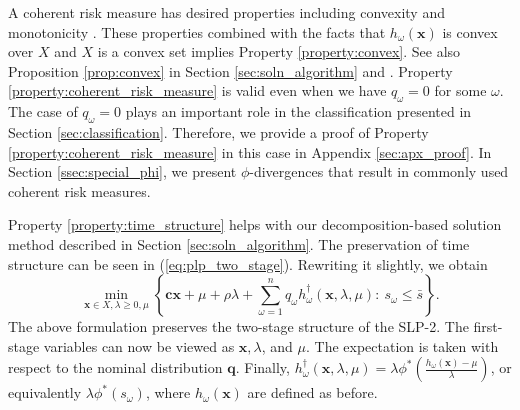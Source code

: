 \documentclass[opre,nonblindrev]{informs3} %
\newcommand{\x}{\mathbf{x}}
\renewcommand{\c}{\mathbf{c}}
\newcommand{\q}{\mathbf{q}}
\begin{document}
A coherent risk measure has desired properties including convexity and monotonicity \citep{rockafellar2007coherent,shaDR:09}.  
These properties combined with the facts that $h_\omega(\x)$ is convex over $X$ and $X$ is a convex set implies Property \ref{property:convex}.  
See also Proposition \ref{prop:convex} in Section \ref{sec:soln_algorithm} and \cite{bental2013robust}. 
Property \ref{property:coherent_risk_measure} is valid even when we have $q_\omega=0$ for some $\omega$.
The case of $q_\omega = 0$ plays an important role in the classification presented in Section \ref{sec:classification}. 
Therefore, we provide a proof of Property \ref{property:coherent_risk_measure} in this case in Appendix \ref{sec:apx_proof}. 
In Section \ref{ssec:special_phi}, we present $\phi$-divergences that result in commonly used coherent risk measures. 


Property \ref{property:time_structure} helps with our decomposition-based solution method described in Section \ref{sec:soln_algorithm}. 
The preservation of time structure can be seen in (\ref{eq:plp_two_stage}).  
Rewriting it slightly, we obtain
\begin{equation}
\label{eq:dec}
\min_{\x \in X,\lambda \geq 0,\mu} \left\{ \c\x + \mu + \rho \lambda +  \sum_{\omega=1}^{n} q_\omega h_\omega^{\dagger}(\x, \lambda, \mu) \colon \ s_\omega \leq \bar{s} \right\}.
\end{equation}
The above formulation preserves the two-stage structure of the SLP-2.
The first-stage variables can now be viewed as $\x, \lambda$, and $\mu$. 
The expectation is taken with respect to the nominal distribution $\q$. 
Finally, $ h^{\dagger}_\omega(\x, \lambda, \mu) =  \lambda \phi^*\left(\frac{h_\omega(\x) - \mu}{\lambda} \right)$, or equivalently $\lambda\phi^*(s_\omega)$, where $h_\omega(\x)$ are defined as before. 
\end{document}
